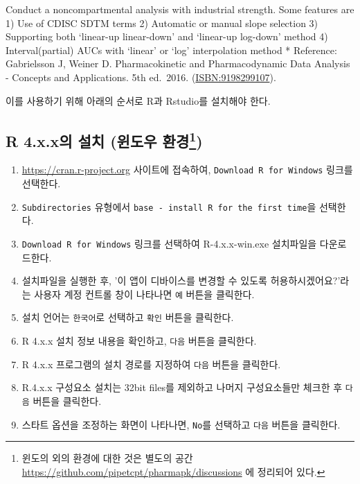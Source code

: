 \documentclass[
  11pt,
  krantz2, a4paper, twoside]{krantz}
\providecommand{\tightlist}{%
  \setlength{\itemsep}{0pt}\setlength{\parskip}{0pt}}
\renewenvironment{quote}{\begin{VF}}{\end{VF}}
\theoremstyle{definition}
\theoremstyle{definition}
\theoremstyle{definition}
\theoremstyle{definition}
\theoremstyle{remark}
\begin{document}
\begin{quote}
Conduct a noncompartmental analysis with industrial strength.
Some features are
1) Use of CDISC SDTM terms
2) Automatic or manual slope selection
3) Supporting both `linear-up linear-down' and `linear-up log-down' method
4) Interval(partial) AUCs with `linear' or `log' interpolation method
* Reference: Gabrielsson J, Weiner D. Pharmacokinetic and Pharmacodynamic Data Analysis - Concepts and Applications. 5th ed.~2016. (\url{ISBN:9198299107}).
\end{quote}

이를 사용하기 위해 아래의 순서로 R과 Rstudio를 설치해야 한다.

\hypertarget{r-4.x.xuxc758-uxc124uxce58-uxc708uxb3c4uxc6b0-uxd658uxacbd}{%
\subsection[R 4.x.x의 설치 (윈도우 환경)]{\texorpdfstring{R 4.x.x의 설치 (윈도우 환경\footnote{윈도의 외의 환경에 대한 것은 별도의 공간 \url{https://github.com/pipetcpt/pharmapk/discussions} 에 정리되어 있다.})}{R 4.x.x의 설치 (윈도우 환경)}}\label{r-4.x.xuxc758-uxc124uxce58-uxc708uxb3c4uxc6b0-uxd658uxacbd}}

\begin{enumerate}
\def\labelenumi{\arabic{enumi}.}
\tightlist
\item
  \url{https://cran.r-project.org} 사이트에 접속하여, \texttt{Download\ R\ for\ Windows} 링크를 선택한다.
\item
  \texttt{Subdirectories} 유형에서 \texttt{base\ -\ install\ R\ for\ the\ first\ time}을 선택한다.
\item
  \texttt{Download\ R\ for\ Windows} 링크를 선택하여 R-4.x.x-win.exe 설치파일을 다운로드한다.
\item
  설치파일을 실행한 후, '이 앱이 디바이스를 변경할 수 있도록 허용하시겠어요?'라는 사용자 계정 컨트롤 창이 나타나면 \texttt{예} 버튼을 클릭한다.
\item
  설치 언어는 \texttt{한국어}로 선택하고 \texttt{확인} 버튼을 클릭한다.
\item
  R 4.x.x 설치 정보 내용을 확인하고, \texttt{다음} 버튼을 클릭한다.
\item
  R 4.x.x 프로그램의 설치 경로를 지정하여 \texttt{다음} 버튼을 클릭한다.
\item
  R.4.x.x 구성요소 설치는 32bit files를 제외하고 나머지 구성요소들만 체크한 후 \texttt{다음} 버튼을 클릭한다.
\item
  스타트 옵션을 조정하는 화면이 나타나면, \texttt{No}를 선택하고 \texttt{다음} 버튼을 클릭한다.
\end{enumerate}
\end{document}

